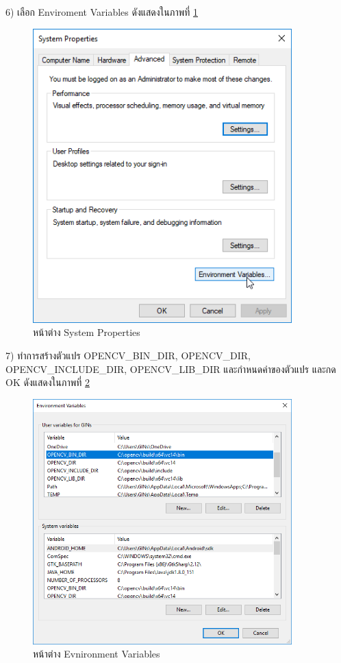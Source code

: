     6) เลือก Enviroment Variables ดังแสดงในภาพที่ \ref{Fig:opencvInstall6}
        \begin{figure}[H]
            \centering\includegraphics[width=10cm]{Figures/7/12}
            \caption{หน้าต่าง System Properties}
            \label{Fig:opencvInstall6}
        \end{figure}

    7) ทำการสร้างตัวแปร {OPENCV\_BIN\_DIR}, {OPENCV\_DIR}, {OPENCV\_INCLUDE\_DIR}, {OPENCV\_LIB\_DIR} 
    และกำหนดค่าของตัวแปร และกด OK ดังแสดงในภาพที่ \ref{Fig:opencvInstall7}
    \begin{figure}[H]
        \centering
        \includegraphics[width=10cm]{Figures/7/13}
        \caption{หน้าต่าง Evnironment Variables}
        \label{Fig:opencvInstall7}
    \end{figure}